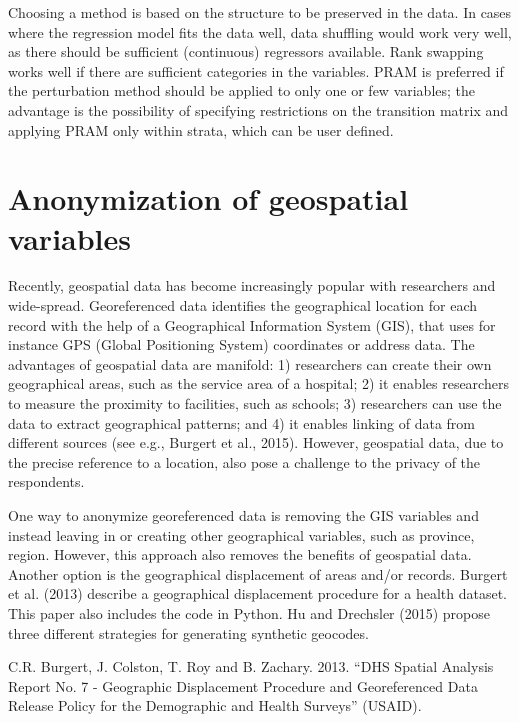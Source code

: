 \documentclass[letterpaper,10pt,english]{sphinxmanual}
\begin{document}
Choosing a method is based on the structure to be preserved in the data.
In cases where the regression model fits the data well, data shuffling
would work very well, as there should be sufficient (continuous)
regressors available. Rank swapping works well if there are sufficient
categories in the variables. PRAM is preferred if the perturbation
method should be applied to only one or few variables; the advantage is
the possibility of specifying restrictions on the transition matrix and
applying PRAM only within strata, which can be user defined.


\section{Anonymization of geospatial variables}
\label{\detokenize{anon_methods:anonymization-of-geospatial-variables}}
Recently, geospatial data has become increasingly popular with
researchers and wide-spread. Georeferenced data identifies the
geographical location for each record with the help of a Geographical
Information System (GIS), that uses for instance GPS (Global Positioning
System) coordinates or address data. The advantages of geospatial data
are manifold: 1) researchers can create their own geographical areas,
such as the service area of a hospital; 2) it enables researchers to
measure the proximity to facilities, such as schools; 3) researchers can
use the data to extract geographical patterns; and 4) it enables linking
of data from different sources (see e.g., Burgert et al., 2015).
However, geospatial data, due to the precise reference to a location,
also pose a challenge to the privacy of the respondents.

One way to anonymize georeferenced data is removing the GIS variables
and instead leaving in or creating other geographical variables, such as
province, region. However, this approach also removes the benefits of
geospatial data. Another option is the geographical displacement of
areas and/or records. Burgert et al. (2013) describe a geographical
displacement procedure for a health dataset. This paper also includes
the code in Python. Hu and Drechsler (2015) propose three different
strategies for generating synthetic geocodes.


C.R. Burgert, J. Colston, T. Roy and B. Zachary. 2013. “DHS Spatial
Analysis Report No. 7 - Geographic Displacement Procedure and
Georeferenced Data Release Policy for the Demographic and Health
Surveys” (USAID). 
\end{document}
